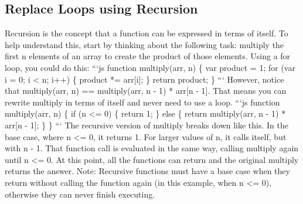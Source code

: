 \documentclass{article}%
\begin{document}
\subsection{Replace Loops using Recursion}%
\label{subsec:ReplaceLoopsusingRecursion}%
Recursion is the concept that a function can be expressed in terms of itself. To help understand this, start by thinking about the following task: multiply the first n elements of an array to create the product of those elements. Using a for loop, you could do this:\newline%
```js\newline%
  function multiply(arr, n) \{\newline%
    var product = 1;\newline%
    for (var i = 0; i < n; i++) \{\newline%
        product *= arr{[}i{]};\newline%
    \}\newline%
    return product;\newline%
  \}\newline%
```\newline%
However, notice that multiply(arr, n) == multiply(arr, n {-} 1) * arr{[}n {-} 1{]}. That means you can rewrite multiply in terms of itself and never need to use a loop.\newline%
```js\newline%
  function multiply(arr, n) \{\newline%
    if (n <= 0) \{\newline%
      return 1;\newline%
    \} else \{\newline%
      return multiply(arr, n {-} 1) * arr{[}n {-} 1{]};\newline%
    \}\newline%
  \}\newline%
```\newline%
The recursive version of multiply breaks down like this. In the base case, where n <= 0, it returns 1. For larger values of n, it calls itself, but with n {-} 1. That function call is evaluated in the same way, calling multiply again until n <= 0.  At this point, all the functions can return and the original multiply returns the answer.\newline%
Note: Recursive functions must have a base case when they return without calling the function again (in this example, when n <= 0), otherwise they can never finish executing.\newline%
\end{document}
